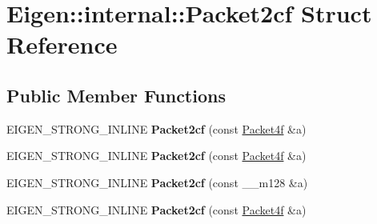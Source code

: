 \hypertarget{struct_eigen_1_1internal_1_1_packet2cf}{}\section{Eigen\+::internal\+::Packet2cf Struct Reference}
\label{struct_eigen_1_1internal_1_1_packet2cf}
\subsection*{Public Member Functions}
\begin{DoxyCompactItemize}
\item 
\mbox{\label{struct_eigen_1_1internal_1_1_packet2cf_aa11922dc62f1730f0ee2ae77e190f9f8}} 
E\+I\+G\+E\+N\+\_\+\+S\+T\+R\+O\+N\+G\+\_\+\+I\+N\+L\+I\+NE {\bfseries Packet2cf} (const \mbox{\hyperlink{struct_eigen_1_1internal_1_1_packet4f}{Packet4f}} \&a)
\item 
\mbox{\label{struct_eigen_1_1internal_1_1_packet2cf_aa11922dc62f1730f0ee2ae77e190f9f8}} 
E\+I\+G\+E\+N\+\_\+\+S\+T\+R\+O\+N\+G\+\_\+\+I\+N\+L\+I\+NE {\bfseries Packet2cf} (const \mbox{\hyperlink{struct_eigen_1_1internal_1_1_packet4f}{Packet4f}} \&a)
\item 
\mbox{\label{struct_eigen_1_1internal_1_1_packet2cf_a4a2b441be6264366ddbad387fa73ff09}} 
E\+I\+G\+E\+N\+\_\+\+S\+T\+R\+O\+N\+G\+\_\+\+I\+N\+L\+I\+NE {\bfseries Packet2cf} (const \+\_\+\+\_\+m128 \&a)
\item 
\mbox{\label{struct_eigen_1_1internal_1_1_packet2cf_aa11922dc62f1730f0ee2ae77e190f9f8}} 
E\+I\+G\+E\+N\+\_\+\+S\+T\+R\+O\+N\+G\+\_\+\+I\+N\+L\+I\+NE {\bfseries Packet2cf} (const \mbox{\hyperlink{struct_eigen_1_1internal_1_1_packet4f}{Packet4f}} \&a)
\end{DoxyCompactItemize}
